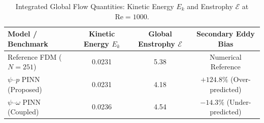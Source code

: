 \begin{table}[htbp]
\centering
\caption{Integrated Global Flow Quantities: Kinetic Energy $E_k$ and Enstrophy $\mathcal{E}$ at $\mathrm{Re} = 1000$.}
\label{tab:energetics}
\small
\setlength{\tabcolsep}{3.5pt}
\begin{tabular}{lccc}
\toprule
\textbf{Model / Benchmark} & \textbf{Kinetic Energy} $E_k$ & \textbf{Global Enstrophy} $\mathcal{E}$ & \textbf{Secondary Eddy Bias} \\
\midrule
Reference FDM ($N=251$) & 0.0231 & 5.38 & Numerical Reference \\
$\psi\text{--}p$ PINN (Proposed) & 0.0231 & 4.18 & $+124.8\%$ (Over-predicted) \\
$\psi\text{--}\omega$ PINN (Coupled) & 0.0236 & 4.54 & $-14.3\%$ (Under-predicted) \\
\bottomrule
\end{tabular}
\end{table}
